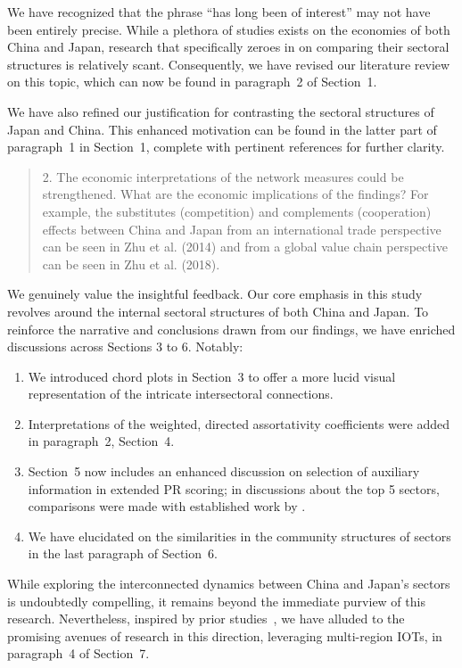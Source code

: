 \documentclass[12pt]{article}
\newenvironment{comment}%
{\begin{quotation}\noindent\small\it\color{darkblue}\ignorespaces%
}{\end{quotation}}
\begin{document}

We have recognized that the phrase ``has long been of interest'' may not have
been entirely precise. While a plethora of studies exists on the economies of
both China and Japan, research that specifically zeroes in on comparing their
sectoral structures is relatively scant. Consequently, we have revised our
literature review on this topic, which can now be found in paragraph~2 of
Section~1.


We have also refined our justification for contrasting the sectoral structures
of Japan and China. This enhanced motivation can be found in the latter part of
paragraph~1 in Section~1, complete with pertinent references for further
clarity.

 
\begin{comment}
2. The economic interpretations of the network measures could be strengthened.
What are the economic implications of the findings? For example, the
substitutes (competition) and complements (cooperation) effects between China
and Japan from an international trade perspective can be seen in Zhu et al.
(2014) and from a global value chain perspective can be seen in Zhu et al.
(2018).
\end{comment}


We genuinely value the insightful feedback. Our core emphasis in this study
revolves around the internal sectoral structures of both China and Japan. To
reinforce the narrative and conclusions drawn from our findings, we have
enriched discussions across Sections 3 to 6. Notably:
\begin{enumerate}
\item
  We introduced chord plots in Section~3 to offer a more lucid visual
  representation of the intricate intersectoral connections.
\item
  Interpretations of the weighted, directed assortativity coefficients were
  added in paragraph~2, Section~4.
\item  
  Section~5 now includes an enhanced discussion on selection of auxiliary
  information in extended PR scoring; in discussions about the top 5 sectors,
  comparisons were made with established work by \citet{li2017examining}.
\item
  We have elucidated on the similarities in the community structures of sectors
  in the last paragraph of Section~6.
\end{enumerate}


While exploring the interconnected dynamics between China and Japan's sectors is
undoubtedly compelling, it remains beyond the immediate purview of this
research. Nevertheless, inspired by prior studies~\citep{zhu2014rise,
  zhu2018similarity}, we have alluded to the promising avenues of research in
this direction, leveraging multi-region IOTs, in paragraph~4 of Section~7.
\end{document}
